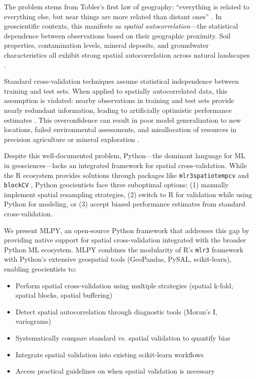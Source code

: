 \documentclass[a4paper,fleqn]{cas-sc}
\begin{document}
The problem stems from Tobler's first law of geography: ``everything is related to everything else, but near things are more related than distant ones'' \citep{tobler1970computer}. In geoscientific contexts, this manifests as \textit{spatial autocorrelation}---the statistical dependence between observations based on their geographic proximity. Soil properties, contamination levels, mineral deposits, and groundwater characteristics all exhibit strong spatial autocorrelation across natural landscapes \citep{goovaerts1997geostatistics, webster2007geostatistics}.

Standard cross-validation techniques assume statistical independence between training and test sets. When applied to spatially autocorrelated data, this assumption is violated: nearby observations in training and test sets provide nearly redundant information, leading to artificially optimistic performance estimates \citep{roberts2017cross, meyer2018improving}. This overconfidence can result in poor model generalization to new locations, failed environmental assessments, and misallocation of resources in precision agriculture or mineral exploration \citep{ploton2020spatial}.

Despite this well-documented problem, Python---the dominant language for ML in geosciences---lacks an integrated framework for spatial cross-validation. While the R ecosystem provides solutions through packages like \texttt{mlr3spatiotempcv} \citep{schratz2019hyperparameter} and \texttt{blockCV} \citep{valavi2019blockcv}, Python geocientists face three suboptimal options: (1) manually implement spatial resampling strategies, (2) switch to R for validation while using Python for modeling, or (3) accept biased performance estimates from standard cross-validation.

We present MLPY, an open-source Python framework that addresses this gap by providing native support for spatial cross-validation integrated with the broader Python ML ecosystem. MLPY combines the modularity of R's \texttt{mlr3} framework \citep{lang2019mlr3} with Python's extensive geospatial tools (GeoPandas, PySAL, scikit-learn), enabling geocientists to:

\begin{itemize}
\item Perform spatial cross-validation using multiple strategies (spatial k-fold, spatial blocks, spatial buffering)
\item Detect spatial autocorrelation through diagnostic tools (Moran's I, variograms)
\item Systematically compare standard vs. spatial validation to quantify bias
\item Integrate spatial validation into existing scikit-learn workflows
\item Access practical guidelines on when spatial validation is necessary
\end{itemize}
\end{document}
